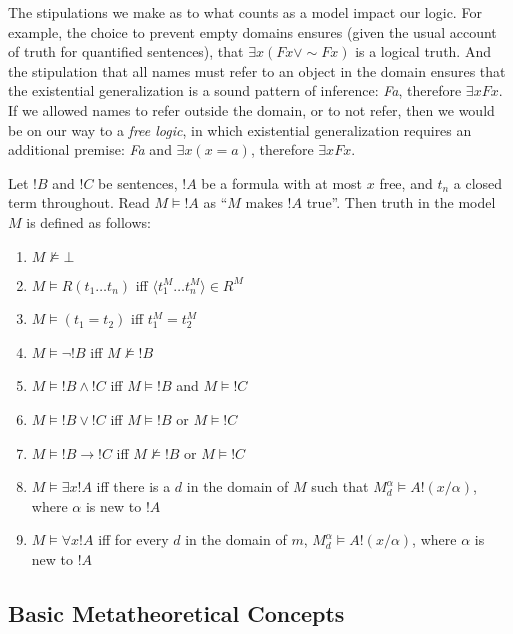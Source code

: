 \documentclass[syntax-and-semantics]{subfiles}
\begin{document}

The stipulations we make as to what counts as a model impact our logic. For example, the choice to prevent empty domains ensures (given the usual account of truth for quantified sentences), that $\exists x(Fx \vee\sim Fx)$ is a logical truth. And the stipulation that all names must refer to an object in the domain ensures that the existential generalization is a sound pattern of inference: \emph{Fa}, therefore $\exists xFx$. If we allowed names to refer outside the domain, or to not refer, then we would be on our way to a \emph{free logic}, in which existential generalization requires an additional premise: \emph{Fa} and $\exists x (x=a)$, therefore $\exists xFx$.

\begin{defn}


Let $!B$ and $!C$ be sentences, $!A$ be a formula with at most $x$ free, and $t_n$ a closed term throughout. Read $M \vDash !A$ as ``$M$ makes $!A$ true''.  Then truth in the model $M$ is defined as follows:
\begin{enumerate}
\item $M \nvDash \bot$
\item $M \vDash R(t_1 \ldots t_n)$ iff $\langle t_1^M \ldots t_n^M \rangle \in R^M$
\item $M \vDash (t_1 = t_2)$ iff $t_1^M=t_2^M$
\item $M \vDash \lnot !B$ iff $M \nvDash !B$
\item $M \vDash !B \land !C$ iff $M \vDash !B$ and $M \vDash !C$
\item $M \vDash !B \lor !C$ iff $M \vDash !B$ or $M \vDash !C$
\item $M \vDash !B \rightarrow !C$ iff $M \nvDash !B$ or $M \vDash !C$
\item $M \vDash \exists x !A$ iff there is a $d$ in the domain of $M$ such that $M^\alpha_d \vDash A!(x/\alpha)$, where $\alpha$ is new to $!A$
\item $M \vDash \forall x !A$ iff for every $d$ in the domain of $m$, $M^\alpha_d \vDash A!(x/\alpha)$, where $\alpha$ is new to $!A$
\end{enumerate}
\end{defn}

\subsection{Basic Metatheoretical Concepts}
\end{document}
